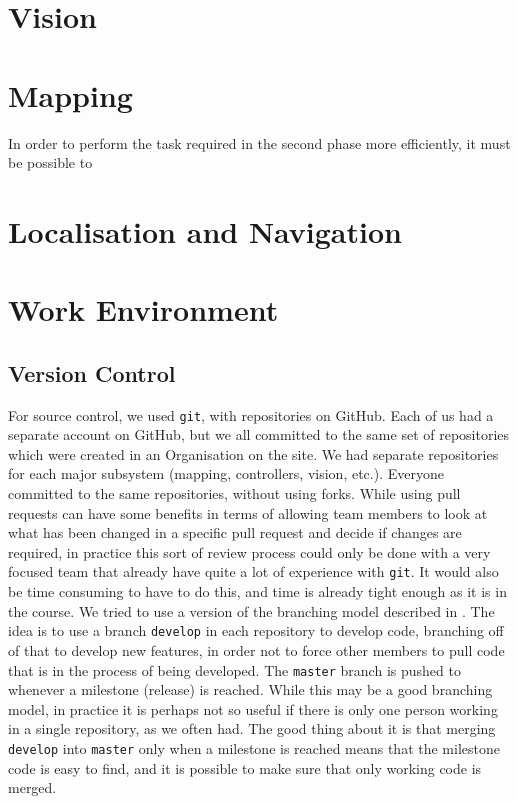 \documentclass[10pt,a4paper]{article}
\begin{document}
\section{Vision}
\section{Mapping}
In order to perform the task required in the second phase more efficiently, it
must be possible to 
\section{Localisation and Navigation}
\section{Work Environment}
\subsection{Version Control}
For source control, we used \texttt{git}, with repositories on GitHub. Each of
us had a separate account on GitHub, but we all committed to the same set of
repositories which were created in an Organisation on the site. We had separate
repositories for each major subsystem (mapping, controllers, vision, etc.).
Everyone committed to the same repositories, without using forks. While using
pull requests can have some benefits in terms of allowing team members to look
at what has been changed in a specific pull request and decide if changes are
required, in practice this sort of review process could only be done with a very
focused team that already have quite a lot of experience with \texttt{git}. It
would also be time consuming to have to do this, and time is already tight
enough as it is in the course. We tried to use a version of the branching model
described in \cite{nviebranch}. The idea is to use a branch \texttt{develop} in
each repository to develop code, branching off of that to develop new features,
in order not to force other members to pull code that is in the process of being
developed. The \texttt{master} branch is pushed to whenever a milestone
(release) is reached. While this may be a good branching model, in practice it
is perhaps not so useful if there is only one person working in a single
repository, as we often had. The good thing about it is that merging
\texttt{develop} into \texttt{master} only when a milestone is reached means
that the milestone code is easy to find, and it is possible to make sure that
only working code is merged.
\end{document}
